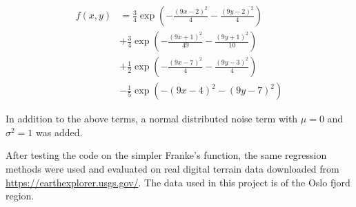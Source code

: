 \begin{align*}
	f\left(x,y\right) &=\frac{3}{4}\exp\left(-\frac{\left(9x-2\right)^2}{4}-\frac{\left(9y-2\right)^2}{4} \right) \\
	&+\frac{3}{4}\exp\left(-\frac{\left(9x+1\right)^2}{49}-\frac{\left(9y+1\right)^2}{10} \right) \\
	&+\frac{1}{2}\exp\left(-\frac{\left(9x-7\right)^2}{4}-\frac{\left(9y-3\right)^2}{4} \right) \\
	&-\frac{1}{5}\exp\left(-\left(9x-4\right)^2-\left(9y-7\right)^2 \right)	
\end{align*}

In addition to the above terms, a normal distributed noise term with $\mu = 0$ and $\sigma^2 = 1$ was added. 

After testing the code on the simpler Franke's function, the same regression methods were used and evaluated on real digital terrain data downloaded from \url{https://earthexplorer.usgs.gov/}. The data used in this project is of the Oslo fjord region. 

